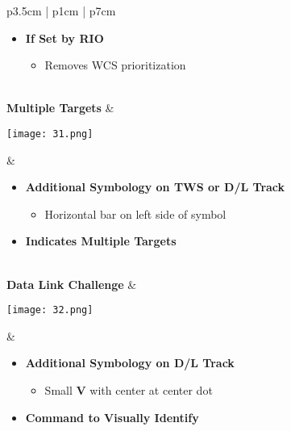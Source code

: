\documentclass[8pt,usenames,dvipsnames,twoside]{article}
\begin{document}
\begin{center}
\begin{longtable}{p{3.5cm} | p{1cm} | p{7cm}}
\begin{minipage}[t]{\linewidth}
\begin{itemize}
\begin{itemize}
						\end{itemize}
						\item \textbf{If Set by RIO}
						\begin{itemize}
							\item Removes WCS prioritization
						\end{itemize}
					\end{itemize}
				\end{minipage} \\
				\midrule
				\textbf{Multiple Targets} &
				\begin{minipage}[t]{\linewidth}
					\vspace{-7pt}
					\centering
					\texttt{[image: 31.png]}
				\end{minipage} &  
				\begin{minipage}[t]{\linewidth}
					\vspace{-7pt}
					\begin{itemize}
						\item \textbf{Additional Symbology on TWS or D/L Track}
						\begin{itemize}
							\item Horizontal bar on left side of symbol
						\end{itemize}
						\item \textbf{Indicates Multiple Targets}
					\end{itemize}
				\end{minipage} \\
				\midrule
				\textbf{Data Link Challenge} &
				\begin{minipage}[t]{\linewidth}
					\vspace{-7pt}
					\centering
					\texttt{[image: 32.png]}
				\end{minipage} &  
				\begin{minipage}[t]{\linewidth}
					\vspace{-7pt}
					\begin{itemize}
						\item \textbf{Additional Symbology on D/L Track}
						\begin{itemize}
							\item Small \textbf{V} with center at center dot
						\end{itemize}
						\item \textbf{Command to Visually Identify}
					\end{itemize}
				\end{minipage} \\

\end{longtable}
\end{center}
\end{document}
